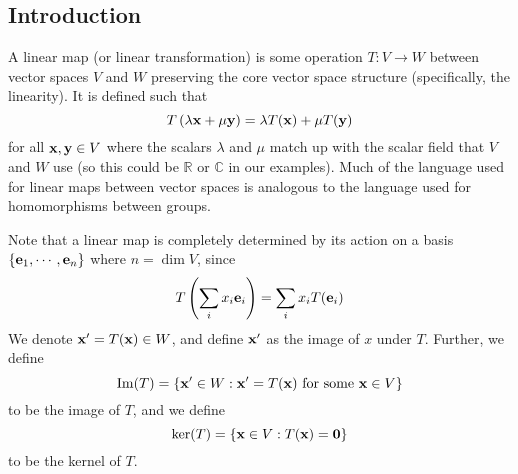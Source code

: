 \subsection{Introduction}
A linear map (or linear transformation) is some operation \(T: V \to W\) between vector spaces \(V\) and \(W\) preserving the core vector space structure (specifically, the linearity).
It is defined such that
\[
	T\left(\lambda \vb x + \mu \vb y\right) = \lambda T(\vb x) + \mu T(\vb y)
\]
for all \(\vb x, \vb y \in V\) where the scalars \(\lambda\) and \(\mu\) match up with the scalar field that \(V\) and \(W\) use (so this could be \(\mathbb R\) or \(\mathbb C\) in our examples).
Much of the language used for linear maps between vector spaces is analogous to the language used for homomorphisms between groups.

Note that a linear map is completely determined by its action on a basis \(\{ \vb e_1, \cdots, \vb e_n \}\) where \(n = \dim V\), since
\[
	T\left(\sum_i x_i \vb e_i \right) = \sum_i x_i T(\vb e_i)
\]
We denote \(\vb x' = T(\vb x) \in W\), and define \(\vb x'\) as the image of \(x\) under \(T\).
Further, we define
\[
	\Im (T) = \{ \vb x' \in W : \vb x' =T(\vb x) \text{ for some } \vb x \in V \}
\]
to be the image of \(T\), and we define
\[
	\ker (T) = \{ \vb x \in V : T(\vb x) = \vb 0 \}
\]
to be the kernel of \(T\).

